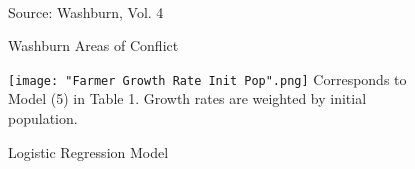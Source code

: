 \documentclass[11pt]{article}
\begin{document}
\begin{landscape}
\pagebreak

\begin{figure}
\caption{Washburn Areas of Conflict}
  \\
Source: Washburn, Vol. 4
\end{figure}

\pagebreak

\end{landscape}



\begin{figure}
\caption{Logistic Regression Model}
  \texttt{[image: "Farmer Growth Rate Init Pop".png]} 
Corresponds to Model (5) in Table 1. Growth rates are weighted by initial population.
\end{figure}
\end{document}
